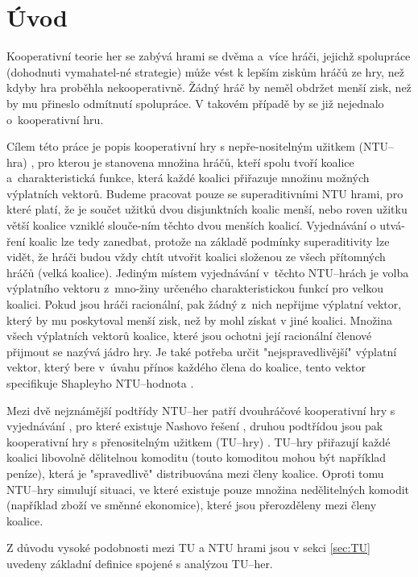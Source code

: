 \section{Úvod}
    Kooperativní teorie her se zabývá hrami se dvěma a~více hráči, jejichž spolupráce (dohodnuti vymahatel-né strategie) může vést k lepším ziskům hráčů ze hry, než kdyby hra proběhla nekooperativně. Žádný hráč by neměl obdržet menší zisk, než by mu přineslo odmítnutí spolupráce. V takovém případě by se již nejednalo o~kooperativní hru.

    Cílem této práce je popis kooperativní hry s nepře-nositelným užitkem (NTU--hra) \cite{Coop_intro,Game_Theory,EOLSS}, pro kterou je stanovena množina hráčů, kteří spolu tvoří koalice a~charakteristická funkce, která každé koalici přiřazuje množinu možných výplatních vektorů. Budeme pracovat pouze se superaditivními NTU hrami, pro které platí, že je součet užitků dvou disjunktních koalic menší, nebo roven užitku větší koalice vzniklé slouče-ním těchto dvou menších koalicí. Vyjednávání o utvá-ření koalic lze tedy zanedbat, protože na základě podmínky superaditivity lze vidět, že hráči budou vždy chtít utvořit koalici složenou ze všech přítomných hráčů (velká koalice). Jediným místem vyjednávání v~těchto NTU--hrách je volba výplatního vektoru z~mno-žiny určeného charakteristickou funkcí pro velkou koalici. Pokud jsou hráči racionální, pak žádný z~nich nepřijme výplatní vektor, který by mu poskytoval menší zisk, než by mohl získat v jiné koalici. Množina všech výplatních vektorů koalice, které jsou ochotni její racionální členové přijmout se nazývá jádro hry. Je také potřeba určit "nejspravedlivější" výplatní vektor, který bere v~úvahu přínos každého člena do koalice, tento vektor specifikuje Shapleyho NTU--hodnota \cite{Shapley1969}.

    Mezi dvě nejznámější podtřídy NTU--her patří dvouhráčové kooperativní hry s vyjednávání \cite{Game_Theory}, pro které existuje Nashovo řešení \cite{Nash1950}, druhou podtřídou jsou pak kooperativní hry s přenositelným užitkem (TU--hry) \cite{Game_Theory,EOLSS}. TU--hry přiřazují každé koalici libovolně dělitelnou komoditu (touto komoditou mohou být například peníze), která je "spravedlivě" distribuována mezi členy koalice. Oproti tomu NTU--hry simulují situaci, ve které existuje pouze množina nedělitelných komodit (například zboží ve směnné ekonomice), které jsou přerozděleny mezi členy koalice.

    Z důvodu vysoké podobnosti mezi TU a NTU hrami jsou v sekci \ref{sec:TU} uvedeny základní definice spojené s analýzou TU--her.

